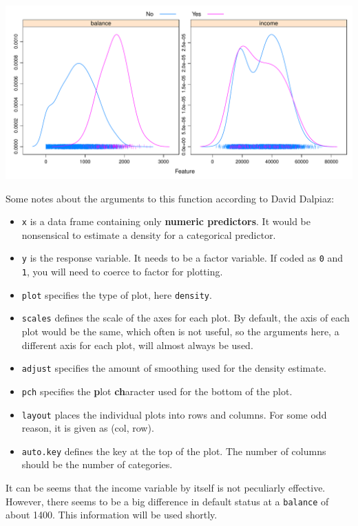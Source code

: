 \documentclass[]{report}
\providecommand{\tightlist}{%
  \setlength{\itemsep}{0pt}\setlength{\parskip}{0pt}}
\begin{document}
\includegraphics{MyBook_files/figure-latex/unnamed-chunk-115-1.pdf}

Some notes about the arguments to this function according to David
Dalpiaz:

\begin{itemize}
\tightlist
\item
  \texttt{x} is a data frame containing only \textbf{numeric
  predictors}. It would be nonsensical to estimate a density for a
  categorical predictor.
\item
  \texttt{y} is the response variable. It needs to be a factor variable.
  If coded as \texttt{0} and \texttt{1}, you will need to coerce to
  factor for plotting.
\item
  \texttt{plot} specifies the type of plot, here \texttt{density}.
\item
  \texttt{scales} defines the scale of the axes for each plot. By
  default, the axis of each plot would be the same, which often is not
  useful, so the arguments here, a different axis for each plot, will
  almost always be used.
\item
  \texttt{adjust} specifies the amount of smoothing used for the density
  estimate.
\item
  \texttt{pch} specifies the \textbf{p}lot \textbf{ch}aracter used for
  the bottom of the plot.
\item
  \texttt{layout} places the individual plots into rows and columns. For
  some odd reason, it is given as (col, row).
\item
  \texttt{auto.key} defines the key at the top of the plot. The number
  of columns should be the number of categories.
\end{itemize}

It can be seems that the income variable by itself is not peculiarly
effective. However, there seems to be a big difference in default status
at a \texttt{balance} of about 1400. This information will be used
shortly.
\end{document}
